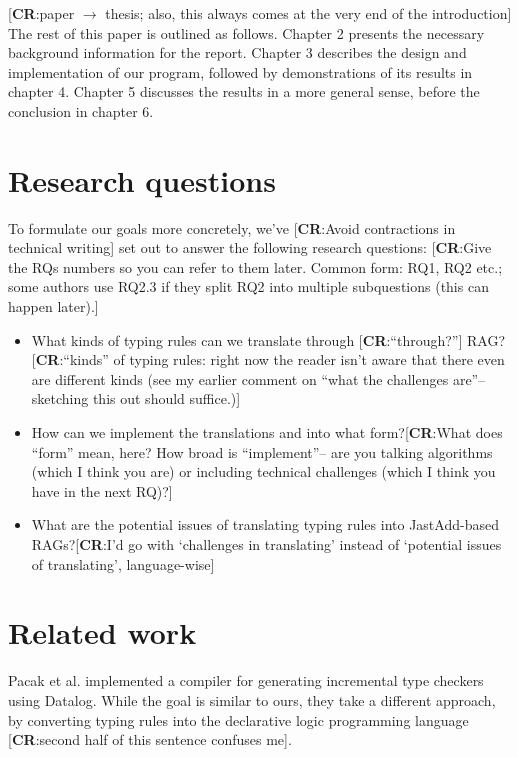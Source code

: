 \documentclass[nofilelist]{cslthse-msc}
\newcommand{\CR}[1]{\textcolor{green!60!black}{[\textbf{CR}:#1]}}
\begin{document}
\CR{paper $\to$ thesis; also, this always comes at the very end of the introduction}
The rest of this paper is outlined as follows.
Chapter 2 presents the necessary background information for the report.
Chapter 3 describes the design and implementation of our program, followed by demonstrations of its results in chapter 4.
Chapter 5 discusses the results in a more general sense, before the conclusion in chapter 6.

\section{Research questions}
To formulate our goals more concretely, we've \CR{Avoid contractions in technical writing} set out to answer the following research questions:
\CR{Give the RQs numbers so you can refer to them later.  Common form: RQ1, RQ2 etc.; some authors use RQ2.3 if they split RQ2 into multiple subquestions (this can happen later).}
\newcommand{\rqone}{What kinds of typing rules can we translate through \CR{``through?''} RAG?}
\newcommand{\rqtwo}{How can we implement the translations and into what form?}
\newcommand{\rqthree}{What are the potential issues of translating typing rules into JastAdd-based RAGs?}
\begin{itemize}
  \item \rqone \CR{``kinds'' of typing rules: right now the reader isn't aware that there even are different kinds (see my earlier comment on ``what the challenges are''-- sketching this out should suffice.)}
  \item \rqtwo \CR{What does ``form'' mean, here?  How broad is ``implement''-- are you talking algorithms (which I think you are) or including technical challenges (which I think you have in the next RQ)?}
  \item \rqthree \CR{I'd go with `challenges in translating' instead of `potential issues of translating', language-wise}
\end{itemize}


\section{Related work} %
Pacak et al. implemented a compiler for generating incremental type checkers using Datalog\cite{Pacak}.
While the goal is similar to ours, they take a different approach, by converting typing rules into the declarative logic programming language \CR{second half of this sentence confuses me}.
\end{document}

